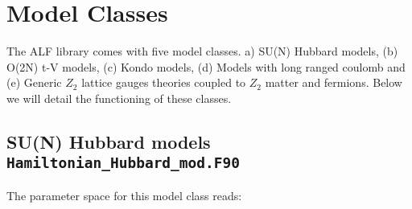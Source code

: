 

\section{  Model Classes }

The ALF  library comes with five model classes. a) SU(N) Hubbard models, (b)  O(2N) t-V models, (c)   Kondo models, (d)    Models with long ranged coulomb and (e)  Generic $Z_2$ lattice gauges theories coupled to $Z_2$ matter  and fermions.   Below we will 
detail the functioning of these classes.  


\subsection{ SU(N) Hubbard models   \texttt{Hamiltonian\_Hubbard\_mod.F90}}

The parameter space for this model class  reads: 

